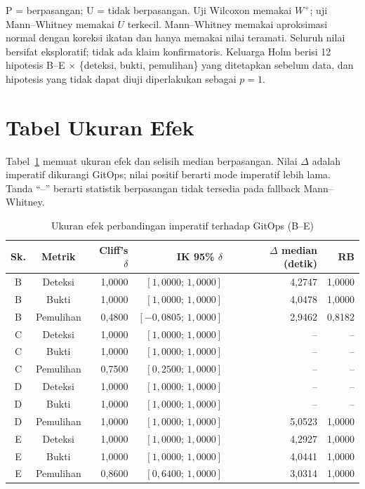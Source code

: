 \noindent\footnotesize P = berpasangan; U = tidak berpasangan. Uji Wilcoxon memakai $W^+$; uji Mann--Whitney memakai $U$ terkecil. Mann--Whitney memakai aproksimasi normal dengan koreksi ikatan dan hanya memakai nilai teramati. Seluruh nilai bersifat eksploratif; tidak ada klaim konfirmatoris. Keluarga Holm berisi 12 hipotesis B--E $\times$ \{deteksi, bukti, pemulihan\} yang ditetapkan sebelum data, dan hipotesis yang tidak dapat diuji diperlakukan sebagai $p=1$.\normalsize

\section{Tabel Ukuran Efek}

Tabel~\ref{tab:lampiran-b-efek} memuat ukuran efek dan selisih median berpasangan. Nilai $\Delta$ adalah imperatif dikurangi GitOps; nilai positif berarti mode imperatif lebih lama. Tanda ``--'' berarti statistik berpasangan tidak tersedia pada fallback Mann--Whitney.

\begin{table}[H]
  \centering
  \scriptsize
  \setlength{\tabcolsep}{2pt}
  \caption{Ukuran efek perbandingan imperatif terhadap GitOps (B--E)}
  \label{tab:lampiran-b-efek}
  \begin{tabularx}{\textwidth}{|c|c|r|r|r|r|}
    \hline
    Sk. & Metrik & Cliff's $\delta$ & IK 95\% $\delta$ & $\Delta$ median (detik) & RB \\
    \hline
    B & Deteksi & 1,0000 & $[1,0000;\,1,0000]$ & 4,2747 & 1,0000 \\
    \hline
    B & Bukti & 1,0000 & $[1,0000;\,1,0000]$ & 4,0478 & 1,0000 \\
    \hline
    B & Pemulihan & 0,4800 & $[-0,0805;\,1,0000]$ & 2,9462 & 0,8182 \\
    \hline
    C & Deteksi & 1,0000 & $[1,0000;\,1,0000]$ & -- & -- \\
    \hline
    C & Bukti & 1,0000 & $[1,0000;\,1,0000]$ & -- & -- \\
    \hline
    C & Pemulihan & 0,7500 & $[0,2500;\,1,0000]$ & -- & -- \\
    \hline
    D & Deteksi & 1,0000 & $[1,0000;\,1,0000]$ & -- & -- \\
    \hline
    D & Bukti & 1,0000 & $[1,0000;\,1,0000]$ & -- & -- \\
    \hline
    D & Pemulihan & 1,0000 & $[1,0000;\,1,0000]$ & 5,0523 & 1,0000 \\
    \hline
    E & Deteksi & 1,0000 & $[1,0000;\,1,0000]$ & 4,2927 & 1,0000 \\
    \hline
    E & Bukti & 1,0000 & $[1,0000;\,1,0000]$ & 4,0441 & 1,0000 \\
    \hline
    E & Pemulihan & 0,8600 & $[0,6400;\,1,0000]$ & 3,0314 & 1,0000 \\
    \hline
  \end{tabularx}
\end{table}

